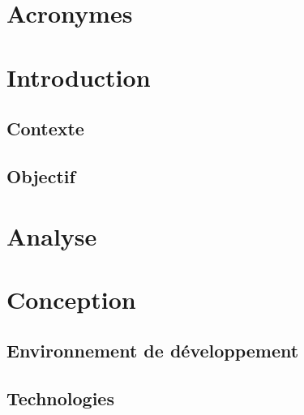 \documentclass[a4paper]{article}
\begin{document}
\section*{Acronymes}
\newpage


\section{Introduction}
\subsection{Contexte}


\subsection{Objectif}


\section{Analyse}


\section{Conception}
\subsection{Environnement de développement}


\subsection{Technologies}

\end{document}
